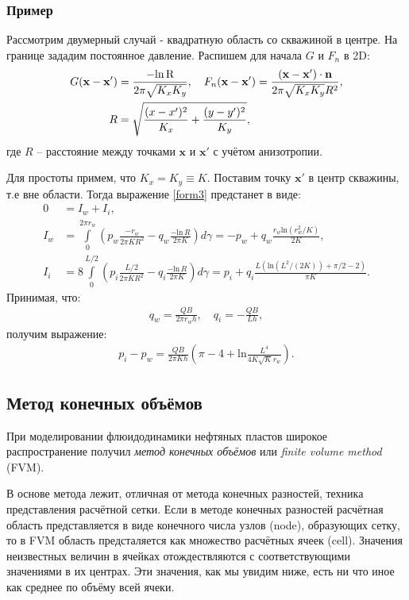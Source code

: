 \subsubsection{Пример}

	Рассмотрим двумерный случай - квадратную область со скважиной в центре. На границе зададим постоянное давление. Распишем для начала $G$ и $F_n$ в 2D:
\begin{align}
	\label{form4}
	G(\mathbf{x}-\mathbf{x}') &= \frac{-\text{ln\,R}}{2\pi\sqrt{K_x K_y}}, \quad
	F_n(\mathbf{x}-\mathbf{x}') = \frac{(\mathbf{x}-\mathbf{x}') \cdot \mathbf{n}}{2\pi\sqrt{K_x K_y}R^2}, \\
	R &= \sqrt{\frac{(x-x')^2}{K_x} + \frac{(y-y')^2}{K_y}},
\end{align}
	где $R$ -- расстояние между точками $\mathbf{x}$ и $\mathbf{x}'$ с учётом анизотропии.
	
	Для простоты примем, что $K_x = K_y \equiv K$. Поставим точку $\mathbf{x}'$ в центр скважины, т.е вне области. Тогда выражение \eqref{form3} предстанет в виде:
\begin{align}
	\label{form5}
	0 &= I_w + I_i, \\
	I_w &= \int\limits_0^{2\pi r_w}\left(p_w\frac{-r_w}{2\pi K R^2} - q_w\frac{-\text{ln}\,R}{2\pi K}\right)d\gamma = 
	-p_w + q_w\frac{r_w \text{ln}({r_w^2}/{K})}{2K},\\
	I_i &= 8 \int\limits_0^{L/2}\left(p_i\frac{L/2}{2\pi K R^2} - q_i\frac{-\text{ln}\,R}{2\pi K}\right)d\gamma =
	p_i + q_i \frac{L\left(\text{ln}(L^2/(2K))+\pi/2 - 2\right)}{\pi K}.
\end{align}
	Принимая, что:
\begin{align}
	\label{form6}
	q_w = \frac{QB}{2\pi r_w h}, \quad q_i = -\frac{QB}{Lh},
\end{align}	
	получим выражение:
\begin{align}
	\label{form7}
	p_i - p_w = \frac{QB}{2\pi K h} \left(\pi - 4 + \text{ln}\frac{L^4}{4K \sqrt{K}r_w}\right).
\end{align}	
	
\subsection{Метод конечных объёмов}
	При моделировании флюидодинамики нефтяных пластов широкое распространение получил \textit{метод конечных объёмов} или \textit{finite volume method} (FVM). 

	В основе метода лежит, отличная от метода конечных разностей, техника представления расчётной сетки.
	Если в методе конечных разностей расчётная область представляется в виде конечного числа узлов (node), образующих сетку, то в FVM область предсталяется как множество расчётных ячеек (cell).
	Значения неизвестных величин в ячейках отождествляются с соответствующими значениями в их центрах.
	Эти значения, как мы увидим ниже, есть ни что иное как среднее по объёму всей ячеки.

